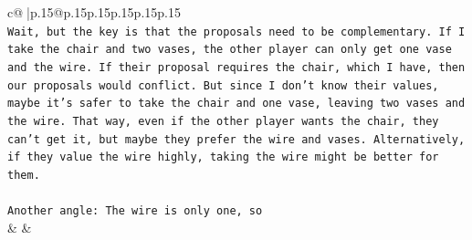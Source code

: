 \documentclass{article}
\begin{document}
{\begin{supertabular}{c@{$\;$}|p{.15\linewidth}@{}p{.15\linewidth}p{.15\linewidth}p{.15\linewidth}p{.15\linewidth}p{.15\linewidth}}
{{{\\ 
\texttt{Wait, but the key is that the proposals need to be complementary. If I take the chair and two vases, the other player can only get one vase and the wire. If their proposal requires the chair, which I have, then our proposals would conflict. But since I don't know their values, maybe it's safer to take the chair and one vase, leaving two vases and the wire. That way, even if the other player wants the chair, they can't get it, but maybe they prefer the wire and vases. Alternatively, if they value the wire highly, taking the wire might be better for them.} \\
\\ 
\texttt{Another angle: The wire is only one, so} \\
            }
        }
    }
    & & \\ \\


\end{supertabular}}
\end{document}
